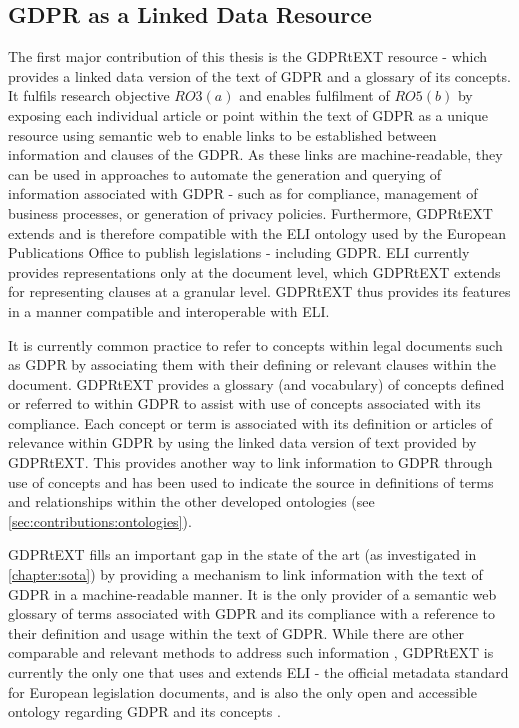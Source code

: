 \subsection{GDPR as a Linked Data Resource}
The first major contribution of this thesis is the GDPRtEXT resource - which provides a linked data version of the text of GDPR and a glossary of its concepts. It fulfils research objective $RO3(a)$ and enables fulfilment of $RO5(b)$ by exposing each individual article or point within the text of GDPR as a unique resource using semantic web to enable links to be established between information and clauses of the GDPR. As these links are machine-readable, they can be used in approaches to automate the generation and querying of information associated with GDPR - such as for compliance, management of business processes, or generation of privacy policies. Furthermore, GDPRtEXT extends and is therefore compatible with the ELI ontology \cite{thomas_european_2019} used by the European Publications Office to publish legislations - including GDPR. ELI currently provides representations only at the document level, which  GDPRtEXT extends for representing clauses at a granular level. GDPRtEXT thus provides its features in a manner compatible and interoperable with ELI.

It is currently common practice to refer to concepts within legal documents such as GDPR by associating them with their defining or relevant clauses within the document. 
GDPRtEXT provides a glossary (and vocabulary) of concepts defined or referred to within GDPR to assist with use of concepts associated with its compliance. Each concept or term is associated with its definition or articles of relevance within GDPR by using the linked data version of text provided by GDPRtEXT. This provides another way to link information to GDPR through use of concepts and has been used to indicate the source in definitions of terms and relationships within the other developed ontologies (see \autoref{sec:contributions:ontologies}).

GDPRtEXT fills an important gap in the state of the art (as investigated in \autoref{chapter:sota}) by providing a mechanism to link information with the text of GDPR in a machine-readable manner. It is the only provider of a semantic web glossary of terms associated with GDPR and its compliance with a reference to their definition and usage within the text of GDPR.
While there are other comparable and relevant methods to address such information \cite{agarwal_legislative_2018,palmirani_pronto_2018-1}, GDPRtEXT is currently the only one that uses and extends ELI \cite{ELI_2012} - the official metadata standard for European legislation documents, and is also the only open and accessible ontology regarding GDPR and its concepts \cite{leone_taking_2019}.

